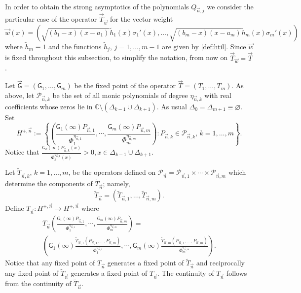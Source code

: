 \documentclass{amsart}
\numberwithin{equation}{section}
\theoremstyle{definition}
\newcommand{\n}{\vec{n}}          %
\begin{document}
 In order to obtain the strong asymptotics of the polynomials $Q_{\n,j}$ we consider the particular case of the operator $\vec{T}_{\vec{w}}$ for the vector weight
 \begin{equation}
     \label{weight:dir}
     \vec{w}(x) = (\sqrt{(b_1-x)(x-a_1)}\tilde{h}_1(x)\sigma_1'(x),\ldots,\sqrt{(b_m-x)(x-a_m)}\tilde{h}_m(x)\sigma_m'(x))
 \end{equation}
 where $\tilde{h}_m\equiv 1$ and the functions $\tilde{h}_j$, $j=1,\ldots,m-1$ are given by \eqref{def:htil}. Since $\vec{w}$ is fixed throughout this subsection, to simplify the notation, from now on $\vec{T}_{\vec{w}} = \vec{T}$.

 Let $\vec{\mathsf{G}} = (\mathsf{G}_1,\ldots,\mathsf{G}_m)$ be the fixed point of the operator $\vec{T} = (T_1,\ldots,T_m)$. As  above, let $\mathcal{P}_{\n,k}$ be the set of all monic polynomials   of degree $\eta_{\n,k}$
 with real coefficients whose zeros lie in  $\mathbb{C} \setminus (\Delta_{k-1} \cup \Delta_{k+1}) $. As usual $\Delta_0 = \Delta_{m+1} \equiv \varnothing$. Set
 \[  H^{+,\n} :=
   \left\{ \left(\frac{\mathsf{G}_1(\infty)P_{\n,1}}{\Phi_1^{\eta_{\n,1}}},\cdots,\frac{\mathsf{G}_m(\infty)P_{\n,m}}{\Phi_m^{\eta_{\n,m}}}\right) : P_{\n,k}\in \mathcal{P}_{\n,k}, \, k=1,\ldots,m \right\}.
 \]
 Notice that $\frac{\mathsf{G}_k(\infty)P_{\n,k}(x)}{\Phi_k^{\eta_{\n,k}}(x)} > 0, x \in  \Delta_{k-1} \cup \Delta_{k+1}$.

 Let $\tilde{T}_{\n,k}$, $k=1,\ldots,m$, be  the operators defined on $\mathcal{P}_{\n} = \mathcal{P}_{\n,1}\times\cdots\times\mathcal{P}_{\n,m}$ which determine the components of $\tilde{T}_{\n}$; namely,
 \[  \tilde{T}_{\n} = (\tilde{T}_{\n,1},\ldots,\tilde{T}_{\n,m}).
 \]
 Define $T_{\n}:H^{+,\n} \to H^{+,\n} $ where
 \begin{multline*}
 	T_{\n}\left(\frac{\mathsf{G}_1(\infty)P_{\n,1}}{\Phi_1^{\eta_{\n,1}}},\cdots,\frac{\mathsf{G}_m(\infty)P_{\n,m}}{\Phi_m^{\eta_{\n,m}}}\right) =\\
 	\left(\mathsf{G}_1(\infty)\frac{\tilde{T}_{\n,1}(P_{\n,1},\ldots,P_{\n,m})}{\Phi_1^{\eta_{\n,1}}},\cdots,\mathsf{G}_m(\infty)\frac{\tilde{T}_{\n,m}(P_{\n,1},\ldots,P_{\n,m})}{\Phi_m^{\eta_{\n,m}}}\right).
 \end{multline*}
 Notice that any fixed point of $T_{\n}$ generates a fixed point of $\tilde{T}_{\n}$ and reciprocally any fixed point of $\tilde{T}_{\n}$ generates a fixed point of ${T}_{\n}$. The continuity of $T_{\n}$ follows from the continuity of $\tilde{T}_{\n}$.
\end{document}
